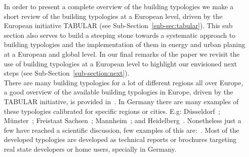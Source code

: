 In order to present a complete overview of the building typologies we make a
short review of the building typologies at a European level, driven by the
European initiative TABULAR (see Sub-Section~\ref{sub-sec:tabular}). This sub
section also serves to build a steeping stone towards a systematic approach to
building typologies and the implementation of them in energy and urban planing
at a European and global level. In our final remarks of the paper we revisit
the use of building typologies at a European level to highlight our envisioned
next steps (see Sub-Section~\ref{sub-section:next}).\\

There are many building typologies for a lot of different regions all over
Europe, a good overview of the available building typologies in Europe, driven
by the TABULAR initiative, is provided in~\cite{TABULAProjectTeam.2010}. In
Germany there are many examples of these typologies calibrated for specific
regions or cities. E.g: D{\"u}sseldorf~\cite{ebok.2005};
M{\"u}nster~\cite{Hildebrandt.2003}; Freistaat Sachsen~\cite{ebok.2000};
Mannheim~\cite{ebokifeu.1998}; and Heidelberg~\cite{ebokifeu.1996}. Nonetheless
just a few have reached a scientific discussion,
few examples of this are:~\cite{Kragh.2013, Singh.2013, Hrabovszky.2013, Caputo.2013}.
Most of the developed typologies are developed as technical reports or
brochures targeting real state developers or home users, specially in
Germany.\\


